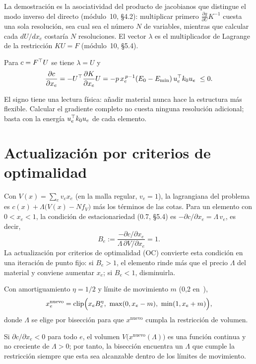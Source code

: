 La demostración es la asociatividad del producto de jacobianos que distingue el modo inverso del directo (módulo~10, §4.2): multiplicar primero $\frac{\partial g}{\partial U}K^{-1}$ cuesta una sola resolución, sea cual sea el número $N$ de variables, mientras que calcular cada $dU/dx_e$ costaría $N$ resoluciones. El vector $\lambda$ es el multiplicador de Lagrange de la restricción $KU=F$ (módulo~10, §5.4).

\begin{corolario}\label{cor:autoadjunto}
Para $c=F^\top U$ se tiene $\lambda=U$ y
\[
\frac{\partial c}{\partial x_e}=-U^\top\frac{\partial K}{\partial x_e}U=-p\,x_e^{\,p-1}(E_0-E_{\min})\,u_e^\top k_0u_e\ \le 0 .
\]
\end{corolario}

El signo tiene una lectura física: añadir material nunca hace la estructura más flexible. Calcular el gradiente completo no cuesta ninguna resolución adicional; basta con la energía $u_e^\top k_0u_e$ de cada elemento.

\addtocounter{definicion}{1}%

\section{Actualización por criterios de optimalidad}

Con $V(x)=\sum_ev_ex_e$ (en la malla regular, $v_e=1$), la lagrangiana del problema es $c(x)+\Lambda\bigl(V(x)-Nf_V\bigr)$ más los términos de las cotas. Para un elemento con $0<x_e<1$, la condición de estacionariedad (0.7, §5.4) es $-\partial c/\partial x_e=\Lambda\,v_e$, es decir,
\[
B_e:=\frac{-\partial c/\partial x_e}{\Lambda\,\partial V/\partial x_e}=1 .
\]
La actualización por criterios de optimalidad (OC) convierte esta condición en una iteración de punto fijo: si $B_e>1$, el elemento rinde más que el precio $\Lambda$ del material y conviene aumentar $x_e$; si $B_e<1$, disminuirla.

\begin{definicion}[Actualización OC]\label{def:oc}
Con amortiguamiento $\eta=1/2$ y límite de movimiento $m$ (0,2 en~\cite{andreassen}),
\[
x_e^{\text{nuevo}}=\clip\Bigl(x_eB_e^{\eta},\ \max(0,x_e-m),\ \min(1,x_e+m)\Bigr),
\]
donde $\Lambda$ se elige por bisección para que $x^{\text{nuevo}}$ cumpla la restricción de volumen.
\end{definicion}

\begin{proposicion}\label{prop:biseccion}
Si $\partial c/\partial x_e<0$ para todo $e$, el volumen $V\bigl(x^{\text{nuevo}}(\Lambda)\bigr)$ es una función continua y no creciente de $\Lambda>0$; por tanto, la bisección encuentra un $\Lambda$ que cumple la restricción siempre que esta sea alcanzable dentro de los límites de movimiento.
\end{proposicion}

